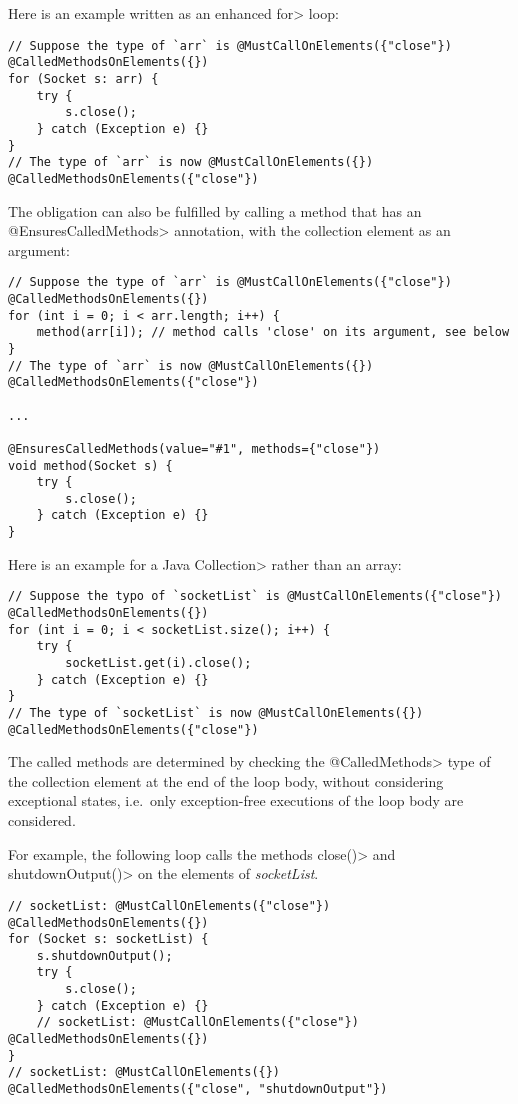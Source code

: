 Here is an example written as an enhanced \<for> loop:

\begin{verbatim}
// Suppose the type of `arr` is @MustCallOnElements({"close"}) @CalledMethodsOnElements({})
for (Socket s: arr) {
    try {
        s.close();
    } catch (Exception e) {}
}
// The type of `arr` is now @MustCallOnElements({}) @CalledMethodsOnElements({"close"})
\end{verbatim}


The obligation can also be fulfilled by calling a method that has an
\<@EnsuresCalledMethods> annotation, with the collection element as an
argument:
\begin{verbatim}
// Suppose the type of `arr` is @MustCallOnElements({"close"}) @CalledMethodsOnElements({})
for (int i = 0; i < arr.length; i++) {
    method(arr[i]); // method calls 'close' on its argument, see below
}
// The type of `arr` is now @MustCallOnElements({}) @CalledMethodsOnElements({"close"})

...

@EnsuresCalledMethods(value="#1", methods={"close"})
void method(Socket s) {
    try {
        s.close();
    } catch (Exception e) {}
}
\end{verbatim}

Here is an example for a Java \<Collection> rather than an array:

\begin{verbatim}
// Suppose the typo of `socketList` is @MustCallOnElements({"close"}) @CalledMethodsOnElements({})
for (int i = 0; i < socketList.size(); i++) {
    try {
        socketList.get(i).close();
    } catch (Exception e) {}
}
// The type of `socketList` is now @MustCallOnElements({}) @CalledMethodsOnElements({"close"})
\end{verbatim}

The called methods are
determined by checking the \<@CalledMethods> type of the collection element at
the end of the loop body, without considering exceptional states, i.e.\ only
exception-free executions of the loop body are considered.

For example, the following loop calls the methods \<close()> and \<shutdownOutput()> on the elements of \textit{socketList}.

\begin{verbatim}
// socketList: @MustCallOnElements({"close"}) @CalledMethodsOnElements({})
for (Socket s: socketList) {
    s.shutdownOutput();
    try {
        s.close();
    } catch (Exception e) {}
    // socketList: @MustCallOnElements({"close"}) @CalledMethodsOnElements({})
}
// socketList: @MustCallOnElements({}) @CalledMethodsOnElements({"close", "shutdownOutput"})
\end{verbatim}

